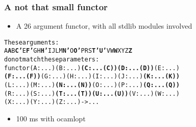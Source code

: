 \documentclass[a4paper,11pt]{beamer}
\begin{document}
\begin{frame}[fragile]\frametitle{A not that small functor}
  \begin{itemize}
    \item A 26 argument functor, with all stdlib modules involved
  \end{itemize}
\begin{alltt}
These arguments:
  {\color{green}{}A} {\color{red}{}\bfseries{}A} {\color{green}{}B} {\color{magenta}{}\bfseries{}C'} {\color{red}{}\bfseries{}} {\color{green}{}E} {\color{magenta}{}\bfseries{}F'} {\color{green}{}G} {\color{green}{}H} {\color{red}{}\bfseries{}H'} {\color{green}{}I} {\color{green}{}J} {\color{red}{}\bfseries{}} {\color{green}{}L} {\color{green}{}M} {\color{magenta}{}\bfseries{}N'} {\color{green}{}O} {\color{red}{}\bfseries{}O'} {\color{green}{}P} {\color{red}{}\bfseries{}} {\color{green}{}R} {\color{green}{}S} {\color{magenta}{}\bfseries{}T'} {\color{magenta}{}\bfseries{}U'} {\color{green}{}V} {\color{green}{}W} {\color{red}{}\bfseries{}W} {\color{green}{}X} {\color{green}{}Y} {\color{green}{}Z} {\color{red}{}\bfseries{}Z}
do not match these parameters:
  functor {\color{green}{}(A : ...)} {\color{red}{}\bfseries{}} {\color{green}{}(B : ...)} {\color{magenta}{}\bfseries{}(C : ...(C))} {\color{red}{}\bfseries{}(D : ...(D))} {\color{green}{}(E : ...)}
  {\color{magenta}{}\bfseries{}(F : ...(F))} {\color{green}{}(G : ...)} {\color{green}{}(H : ...)} {\color{red}{}\bfseries{}} {\color{green}{}(I : ...)} {\color{green}{}(J : ...)} {\color{red}{}\bfseries{}(K : ...(K))}
  {\color{green}{}(L : ...)} {\color{green}{}(M : ...)} {\color{magenta}{}\bfseries{}(N : ...(N))} {\color{green}{}(O : ...)} {\color{red}{}\bfseries{}} {\color{green}{}(P : ...)} {\color{red}{}\bfseries{}(Q : ...(Q))}
  {\color{green}{}(R : ...)} {\color{green}{}(S : ...)} {\color{magenta}{}\bfseries{}(T : ...(T))} {\color{magenta}{}\bfseries{}(U : ...(U))} {\color{green}{}(V : ...)} {\color{green}{}(W : ...)} {\color{red}{}\bfseries{}}
  {\color{green}{}(X : ...)} {\color{green}{}(Y : ...)} {\color{green}{}(Z : ...)} {\color{red}{}\bfseries{}} -> ...
\end{alltt}

  \begin{itemize}
    \item 100 ms with ocamlopt
  \end{itemize}

\end{frame}
\end{document}
